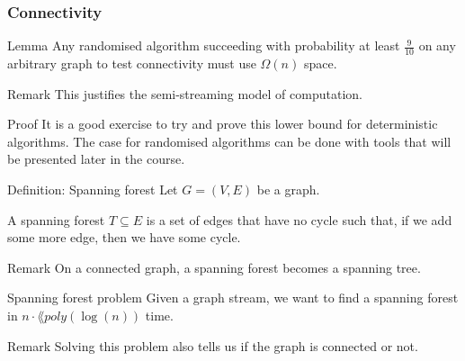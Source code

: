 \documentclass[a4paper]{article}
\begin{document}
\subsubsection{Connectivity}

\begin{parag}{Lemma}
    Any randomised algorithm succeeding with probability at least $\frac{9}{10}$ on any arbitrary graph to test connectivity must use $\Omega\left(n\right)$ space.

    \begin{subparag}{Remark}
        This justifies the semi-streaming model of computation.
    \end{subparag}

    \begin{subparag}{Proof}
        It is a good exercise to try and prove this lower bound for deterministic algorithms. The case for randomised algorithms can be done with tools that will be presented later in the course.
    \end{subparag}
\end{parag}

\begin{parag}{Definition: Spanning forest}
    Let $G = \left(V, E\right)$ be a graph. 

    A spanning forest $T \subseteq E$ is a set of edges that have no cycle such that, if we add some more edge, then we have some cycle.

    \begin{subparag}{Remark}
        On a connected graph, a spanning forest becomes a spanning tree.
    \end{subparag}
\end{parag}

\begin{parag}{Spanning forest problem}
    Given a graph stream, we want to find a spanning forest in $n\cdot\lang{poly}\left(\log\left(n\right)\right)$ time.

    \begin{subparag}{Remark}
        Solving this problem also tells us if the graph is connected or not.
    \end{subparag}
\end{parag}
\end{document}
